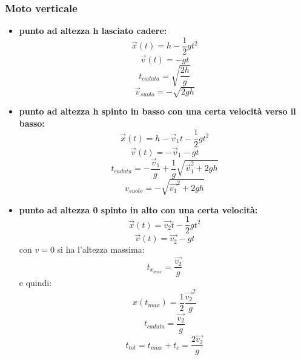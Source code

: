 \documentclass[a4paper,12pt, oneside]{book}
\begin{document}
\subsubsection{Moto verticale}
\begin{itemize}
	\item \textbf{punto ad altezza h lasciato cadere:}
	      $$\vec{x}(t)=h-\frac{1}{2} g t^2$$
	      $$\vec{v}(t)=-gt$$
	      $$t_{caduta}=\sqrt{\frac{2 h}{g}}$$
	      $$\vec{v}_{suolo}=-\sqrt{2 g h}$$
	\item \textbf{punto ad altezza h spinto in basso con una certa velocità verso il basso:}
	      $$\vec{x}(t)=h-\vec{v}_1t-\frac{1}{2} g t^2$$
	      $$\vec{v}(t)=-\vec{v}_1-gt$$
	      $$t_{caduta}=-\frac{\vec{v}_1}{g}+\frac{1}{g}\sqrt{\vec{v}_1^2+2gh}$$
	      $$v_{suolo}=-\sqrt{\vec{v_1}^2+2gh}$$
	\item \textbf{punto ad altezza 0 spinto in alto con una certa velocità:}
	      $$\vec{x}(t)=\vec{v_2}t-\frac{1}{2} g t^2$$
	      $$\vec{v}(t)=\vec{v_2}-gt$$
	      con $v=0$ si ha l'altezza massima:
	      $$t_{x_{max}}=\frac{\vec{v_2}}{g}$$
	      e quindi:
	      $$x(t_{max})=\frac{1}{2}\frac{\vec{v_2}^2}{g}$$
	      $$t_{caduta}=\frac{\vec{v_2}}{g}$$
	      $$t_{tot}=t_{max}+t_c=\frac{2\vec{v_2}}{g}$$
\end{itemize}
\begin{comment}
\subsubsection{Moto nel Piano}\textbf{da sistemare}
\begin{itemize}
	\item \textbf{modulo della velocità in componenti cartesiane}: $$v=|\vec{v}|=\sqrt{v_x^2+v_y^2}$$
	\item \textbf{modulo della velocità in componenti cartesiane}:
	      $$v=|\vec{v}|=\sqrt{v_r^2+v_q^2}$$
	\item \textbf{accelerazione nel piano: }$\vec{a}=\vec{a}_T+\vec{a}_n$
\end{itemize}
\end{comment}
\end{document}

